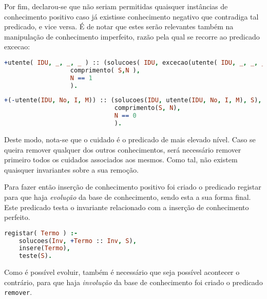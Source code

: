 \documentclass[a4paper]{article}
\begin{document}
\par Por fim, declarou-se que não seriam permitidas quaisquer instâncias de conhecimento positivo caso já existisse conhecimento negativo que contradiga tal predicado, e vice versa. É de notar que estes serão relevantes também na manipulação de conhecimento imperfeito, razão pela qual se recorre ao predicado excecao:

\begin{lstlisting}[language=Prolog, caption=Não permitir a inserção de utente com um ID que já esta registado na base de conhecimento como conhecimento imperfeito.]
+utente( IDU, _, _, _ ) :: (solucoes( IDU, excecao(utente( IDU, _, _, _ )),S ),
                  comprimento( S,N ), 
                  N == 1
                  ).
\end{lstlisting}

\begin{lstlisting}[language=Prolog, caption=Invariante estrutural : Não permitir a inserção de conhecimento negativo contraditório relativo a utentes que existem como conhecimento positivo na base de conhecimento.]
+(-utente(IDU, No, I, M)) :: (solucoes(IDU, utente(IDU, No, I, M), S),
                              comprimento(S, N),
                              N == 0
                              ).
\end{lstlisting}

\par Deste modo, nota-se que o cuidado é o predicado de mais elevado nível. Caso se queira remover qualquer dos outros conhecimentos, será necessário remover primeiro todos os cuidados associados aos mesmos. Como tal, não existem quaisquer invariantes sobre a sua remoção.



Para fazer então inserção de conhecimento positivo foi criado o predicado registar para que haja \emph{evolução} da base de conhecimento, sendo esta a sua forma final. Este predicado testa o invariante relacionado com a inserção de conhecimento perfeito.

\begin{lstlisting}[language=Prolog, caption=Predicado que permite a inserção de conhecimento perfeito.]
registar( Termo ) :- 
	solucoes(Inv, +Termo :: Inv, S),
	insere(Termo),
	teste(S).
\end{lstlisting}

Como é possível evoluir, também é necessário que seja possível acontecer o contrário, para que haja \emph{involução} da base de conhecimento foi criado o predicado \texttt{remover}. 
\end{document}
